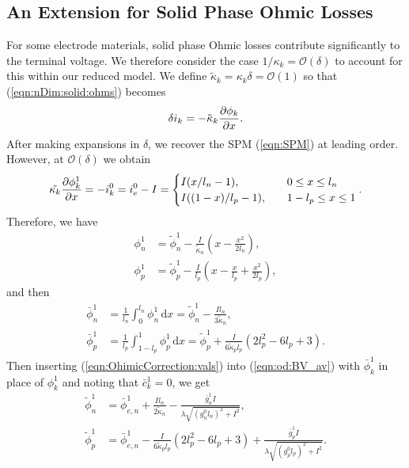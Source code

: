 \documentclass[preprint]{elsarticle}
\begin{document}
\subsection{An Extension for Solid Phase Ohmic Losses}
For some electrode materials, solid phase Ohmic losses contribute significantly to the terminal voltage. We therefore consider the case $1/\kappa_k=\mathcal{O}(\delta)$ to account for this within our reduced model. We define $\tilde{\kappa}_k=\kappa_k \delta = \mathcal{O}(1)$ so that (\ref{eqn:nDim:solid:ohms}) becomes
\begin{equation} 
	\mathcal{\delta} i_k = -\tilde{\kappa}_k \pdv{\phi_k}{x}. 
\end{equation} 
After making expansions in $\delta$, we recover the SPM (\ref{eqn:SPM}) at leading order. However, at $\mathcal{O}(\delta)$ we obtain 
\begin{equation} 
	\tilde{\kappa_k} \pdv{\phi_k^1}{x} = - i_k^0 = i_e^0-I =
    \begin{cases} 
    I(x/l_n - 1), \quad &0\leq x\leq l_n \\ 
    I((1-x)/l_p - 1), \quad &1-l_p \leq x \leq 1 
    \end{cases}.
\end{equation} 
Therefore, we have 
\begin{subequations} 
\begin{align} 
	\phi_n^1 &= \tilde{\phi}_n^1 - \frac{I}{\tilde{\kappa}_n}\left(x - \frac{x^2}{2l_n}\right), \\ 
    \phi_p^1 &= \tilde{\phi}_p^1 - \frac{I}{l_p} \left( x - \frac{x}{l_p} + \frac{x^2}{2l_p} \right), 
\end{align} 
\end{subequations} 
and then 
\begin{subequations} \label{eqn:OhimicCorrection:vals}
\begin{align} 
\bar{\phi}_n^1 &= \frac{1}{l_n} \int_0^{l_n}\phi_n^1\, \text{d}x = \tilde{\phi}_n^1 - \frac{I l_n}{3 \tilde{\kappa}_n}, \\ 
\bar{\phi}_p^1 &= \frac{1}{l_p} \int_{1-l_p}^{1}\phi_p^1\, \text{d}x = \tilde{\phi}_p^1 + \frac{I}{6 \tilde{\kappa}_p l_p}\left(2l_p^2 - 6l_p + 3 \right).
\end{align}
\end{subequations} 
Then inserting (\ref{eqn:OhimicCorrection:vals}) into (\ref{eqn:od:BV_av}) with $\bar{\phi}_k^1$ in place of $\phi_k^1$ and noting that $\bar{c}^1_k=0$, we get
\begin{subequations} 
\begin{align} 
	\tilde{\phi}_n^1 &= \bar{\phi}_{e,n}^1 +\frac{Il_n}{2\tilde{\kappa}_n} - \frac{\bar{g}_n^1I}{\lambda\sqrt{(g_n^0l_n)^2 + I^2}}, \\
    \tilde{\phi}_p^1 &= \bar{\phi}_{e,n}^1 - \frac{I}{6 \tilde{\kappa}_p l_p}\left(2l_p^2 - 6l_p + 3 \right) + \frac{\bar{g}_p^1I}{\lambda\sqrt{(g_p^0l_p)^2 + I^2}}.
\end{align} 
\end{subequations} 
\end{document}
